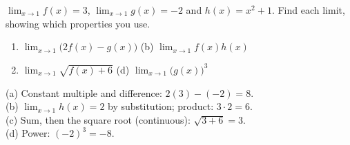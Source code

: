 \begin{exo}{}
$\displaystyle\lim_{x\to1}f(x)=3$, $\displaystyle\lim_{x\to1}g(x)=-2$ and $h(x)=x^2+1$. Find each limit, showing which properties you use.
\begin{enumerate}[label=(\alph*)]
\item $\displaystyle\lim_{x\to1}\big(2f(x)-g(x)\big)$ \qquad (b) $\displaystyle\lim_{x\to1}f(x)h(x)$
\setcounter{enumi}{2}
\item $\displaystyle\lim_{x\to1}\sqrt{f(x)+6}$ \qquad (d) $\displaystyle\lim_{x\to1}\big(g(x)\big)^3$
\end{enumerate}
\begin{solution}
(a) Constant multiple and difference: $2(3)-(-2)=8$.\\
(b) $\lim_{x\to1}h(x)=2$ by substitution; product: $3\cdot2=6$.\\
(c) Sum, then the square root (continuous): $\sqrt{3+6}=3$.\\
(d) Power: $(-2)^3=-8$.
\end{solution}
\end{exo}

